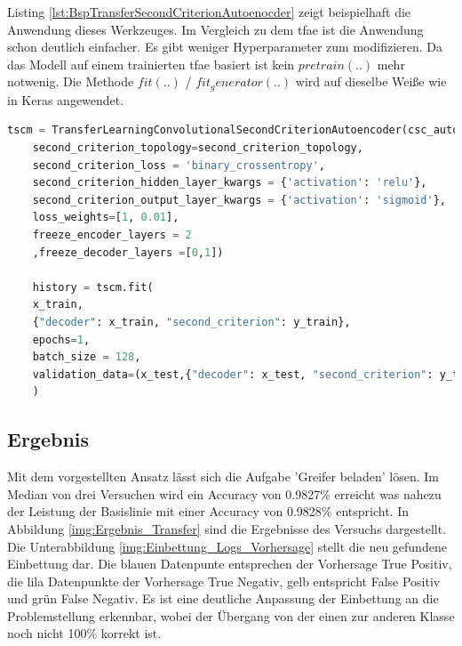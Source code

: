 	Listing \ref{lst:BspTransferSecondCriterionAutoenocder} zeigt beispielhaft die Anwendung dieses Werkzeuges. Im Vergleich zu dem \ac{tfae} ist die Anwendung schon deutlich einfacher. Es gibt weniger Hyperparameter zum modifizieren. Da das Modell auf einem trainierten \ac{tfae} basiert ist kein $pretrain(..)$ mehr notwenig. Die Methode $fit(..)$ / $fit_generator(..)$ wird auf dieselbe Weiße wie in Keras angewendet.	
	
	\begin{lstlisting}[language=python,caption=Beispiel TransferSecondCriterionAutoenocder in Python, label=lst:BspTransferSecondCriterionAutoenocder]
	tscm = TransferLearningConvolutionalSecondCriterionAutoencoder(csc_autoencoder,
	second_criterion_topology=second_criterion_topology,
	second_criterion_loss = 'binary_crossentropy',                                                                                                   
	second_criterion_hidden_layer_kwargs = {'activation': 'relu'},
	second_criterion_output_layer_kwargs = {'activation': 'sigmoid'}, 
	loss_weights=[1, 0.01],
	freeze_encoder_layers = 2
	,freeze_decoder_layers =[0,1])
	
	history = tscm.fit(
	x_train,
	{"decoder": x_train, "second_criterion": y_train}, 
	epochs=1,
	batch_size = 128,
	validation_data=(x_test,{"decoder": x_test, "second_criterion": y_test}))
	)
	\end{lstlisting}	
	
	\subsection{Ergebnis}
	Mit dem vorgestellten Ansatz lässt sich die Aufgabe 'Greifer beladen' lösen. Im Median von drei Versuchen wird ein Accuracy von 0.9827\% erreicht was nahezu der Leistung der Basislinie mit einer Accuracy von 0.9828\% entspricht. In Abbildung \ref{img:Ergebnis_Transfer} sind die Ergebnisse des Versuchs dargestellt. Die Unterabbildung \ref{img:Einbettung_Logs_Vorhersage} stellt die neu gefundene Einbettung dar. Die blauen Datenpunte entsprechen der Vorhersage True Positiv, die lila Datenpunkte der Vorhersage True Negativ, gelb entspricht False Positiv und grün False Negativ. Es ist eine deutliche Anpassung der Einbettung an die Problemstellung erkennbar, wobei der Übergang von der einen zur anderen Klasse noch nicht 100\% korrekt ist.  

